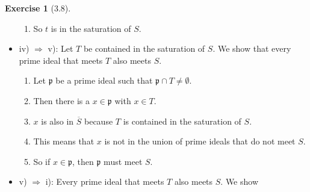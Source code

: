 \documentclass{book}
\theoremstyle{plain}
\theoremstyle{definition}
\newtheorem{exercise}[theorem]{Exercise}
\theoremstyle{custom_definition}
\begin{document}
\begin{exercise}[3.8]
\begin{itemize}
\begin{enumerate}
            \item So \(t\) is in the saturation of \(S\).
        \end{enumerate}
        \item iv) \(\Rightarrow\) v): Let \(T\) be contained in the saturation of \(S\). We show that every prime ideal that meets \(T\) also meets \(S\).
        \begin{enumerate}
            \item Let \(\mathfrak{p}\) be a prime ideal such that \(\mathfrak{p} \cap T \neq \emptyset\).
            \item Then there is a \(x \in \mathfrak{p}\) with \(x \in T\).
            \item \(x\) is also in \(\overline{S}\) because \(T\) is contained in the saturation of \(S\).
            \item This means that \(x\) is not in the union of prime ideals that do not meet \(S\).
            \item So if \(x \in \mathfrak{p}\), then \(\mathfrak{p}\) must meet \(S\).
        \end{enumerate}
        \item v) \(\Rightarrow\) i): Every prime ideal that meets \(T\) also meets \(S\). We show \(\)
    \end{itemize}
\end{exercise}
\end{document}
